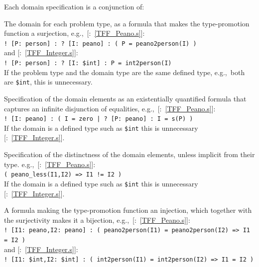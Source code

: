 \documentclass{ceurart}
\newcommand{\smalltt}[1]{\small \texttt{#1}}
\newcommand{\example}{{\scriptsize \faFile[regular]}}
\newenvironment{packed_itemize}{
\vspace*{-0.3em}
\begin{itemize}
\setlength{\partopsep}{0pt}
\setlength{\itemsep}{1pt}
\setlength{\parskip}{0pt}
\setlength{\parsep}{0pt}
}{\end{itemize}}
\begin{document}
Each domain specification is a conjunction of:
\begin{packed_itemize}
\item The domain for each problem type, as a formula that makes the type-promotion function a 
      surjection, e.g.,~[\example{}:~\ref{TFF_Peano.s}]:\\
      \hspace*{0.5cm}\smalltt{! [P: person] : ? [I: peano] : ( P = peano2person(I) )}\\
      and [\example{}:~\ref{TFF_Integer.s}]:\\
      \hspace*{0.5cm}\smalltt{! [P: person] : ? [I: \$int] : P = int2person(I)}\\
      If the problem type and the domain type are the same defined type, e.g.,~both are 
      \smalltt{\$int}, this is unnecessary.
\item Specification of the domain elements as an existentially quantified formula that captures an
      infinite disjunction of equalities, e.g.,~[\example{}:~\ref{TFF_Peano.s}]:\\
      \hspace*{0.5cm}\smalltt{! [I: peano] : ( I = zero | ? [P: peano] : I = s(P) )} \\
      If the domain is a defined type such as \smalltt{\$int} this is unnecessary
      [\example{}:~\ref{TFF_Integer.s}].
\item Specification of the distinctness of the domain elements, unless implicit from their type.
      e.g.,~[\example{}:~\ref{TFF_Peano.s}]:\\
      \hspace*{0.5cm}\smalltt{( peano\_less(I1,I2) => I1 != I2 )}\\
      If the domain is a defined type such as \smalltt{\$int} this is unnecessary
      [\example{}:~\ref{TFF_Integer.s}].
\item A formula making the type-promotion function an injection, which together with the 
      surjectivity makes it a bijection, e.g.,~[\example{}:~\ref{TFF_Peano.s}]:\\
      \hspace*{0.5cm}\smalltt{! [I1: peano,I2: peano] : ( peano2person(I1) = peano2person(I2) => I1 = I2 )}\\
      and [\example{}:~\ref{TFF_Integer.s}]:\\
      \hspace*{0.5cm}\smalltt{! [I1: \$int,I2: \$int] : ( int2person(I1) = int2person(I2) => I1 = I2 )}
\end{packed_itemize}
\end{document}
